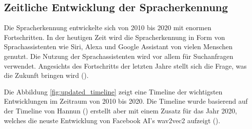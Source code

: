 \documentclass[11pt,a4paper]{article}
\begin{document}
\subsection{Zeitliche Entwicklung der Spracherkennung}
Die Spracherkennung entwickelte sich von 2010 bis 2020 mit enormen Fortschritten. In der heutigen
Zeit wird die Spracherkennung in Form von Sprachassistenten wie Siri, Alexa und Google Assistant von
vielen Menschen genutzt. Die Nutzung der Sprachassistenten wird vor allem für Suchanfragen
verwendet. Angesichts des Fortschritts der letzten Jahre stellt sich die Frage, was die Zukunft
bringen wird (\cite{hannun2021history}).

\noindent \newline
Die Abbildung \ref{fig:updated_timeline} zeigt eine Timeline der wichtigsten Entwicklungen im
Zeitraum von 2010 bis 2020. Die Timeline wurde basierend auf der Timeline von Hannun 
(\cite{hannun2021history}) erstellt aber mit einem Zusatz für das Jahr 2020, welches die neuste
Entwicklung von Facebook AI's wav2vec2 aufzeigt (\cite{baevski2020wav2vec}).
\end{document}
